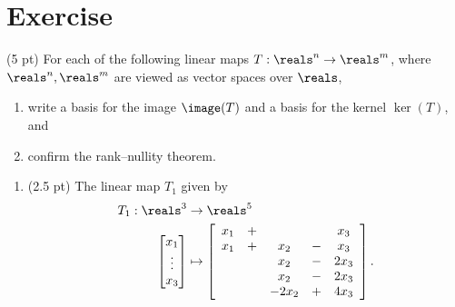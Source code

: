 %
%
\section{Exercise}

(5 pt) For each of the following linear maps $T : \reals^{n} \rightarrow \reals^{m}$, where $\reals^{n},\reals^{m}$ are viewed as vector spaces over $\reals$,
\begin{enumerate}[label=(\roman*)]
\item write a basis for the image $\image(T)$ and a basis for the kernel $\ker(T)$, and
\item confirm the rank--nullity theorem.
\end{enumerate}
\begin{enumerate}[label=(\alph*)]
\item\label{itm : Quiz17Aa} (2.5 pt) The linear map $T_{1}$ given by
\begin{align*}
T_{1}
:
\reals^{3}
&\rightarrow
\reals^{5}
\\
\begin{bmatrix}
x_{1}		\\
\vdots	\\
x_{3}
\end{bmatrix}
&\mapsto
\left[
\begin{array}{c c c c c c c}
x_{1}	&	+	&			&		&	x_{3}		\\
x_{1}	&	+	&	x_{2}		&	-	&	x_{3}		\\
	&		&	x_{2}		&	-	&	2 x_{3}	\\
	&		&	x_{2}		&	-	&	2 x_{3}	\\
	&		&	-2 x_{2}	&	+	&	4 x_{3}
\end{array}
\right].
\end{align*}
\end{enumerate}



